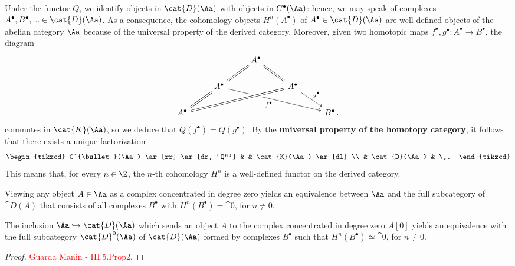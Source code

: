 \begin{rmk}
    Under the functor $Q$, we identify objects 
    in $\cat{D}(\Aa)$ with objects in $C^{\bullet}(\Aa)$:
    hence, we may speak of complexes 
    $A^{\bullet}, B^{\bullet}, ... \in \cat{D}(\Aa)$.
    As a consequence, the cohomology objects $H^{n}(A^{\bullet})$
    of $A^{\bullet}\in \cat{D}(\Aa)$ are well-defined
    objects of the abelian category $\Aa$ because
    of the universal property of the derived category.
    Moreover, given two homotopic maps
    $f^{\bullet}, g^{\bullet}:A^{\bullet} \to B^{\bullet}$,
    the diagram
    \begin{equation*}
            \begin{tikzcd}
                & & A^{\bullet} \arrow[ld, equals] \arrow[rd, equals]  
                & & \\
                & A^{\bullet} \arrow[ld, equals] \arrow[rrrd, "f^{\bullet}"'] 
                & & A^{\bullet} \arrow[llld, equals, crossing over] \arrow[rd, "g^{\bullet}"] 
                & \\
                A^{\bullet} 
                &  &  &  & B^{\bullet}\,.
            \end{tikzcd}
    \end{equation*}
    commutes in $\cat{K}(\Aa)$, so we deduce that 
    $Q(f^{\bullet}) = Q(g^{\bullet})$.
    By the \textbf{universal property of the homotopy category},
    it follows that there exists a unique factorization
    \begin{equation*}
        \begin{tikzcd}
            C^{\bullet}(\Aa) \ar[rr] \ar[dr, "Q"'] 
            & & \cat{K}(\Aa) \ar[dl] \\
            & \cat{D}(\Aa) & \,.
        \end{tikzcd}
    \end{equation*}
    This means that, for every $n \in \Z$, 
    the $n$-th cohomology $H^{n}$ is a well-defined functor
    on the derived category.
\end{rmk}

\begin{rmk}
    Viewing any object $A \in \Aa$ as a complex 
    concentrated in degree zero yields an equivalence 
    between $\Aa$ and the full subcategory of $\cat{D}(A)$
    that consists of all complexes $B^{\bullet}$ 
    with $H^{n}(B^{\bullet}) = \cat{0}$, for $n \ne 0$.
\end{rmk}

\begin{thm}
    The inclusion $\Aa \hookrightarrow \cat{D}(\Aa)$
    which sends an object $A$ to the complex
    concentrated in degree zero $A{[0]}$ 
    yields an equivalence with the full subcategory 
    $\cat{D}^{0}(\Aa)$ of $\cat{D}(\Aa)$ formed by
    complexes $B^{\bullet}$ such that 
    $H^{n}(B^{\bullet}) \simeq \cat{0}$,
    for $n \ne 0$.
    \begin{proof}
        \textcolor{red}{Guarda Manin - III.5.Prop2}.
    \end{proof}
\end{thm}

